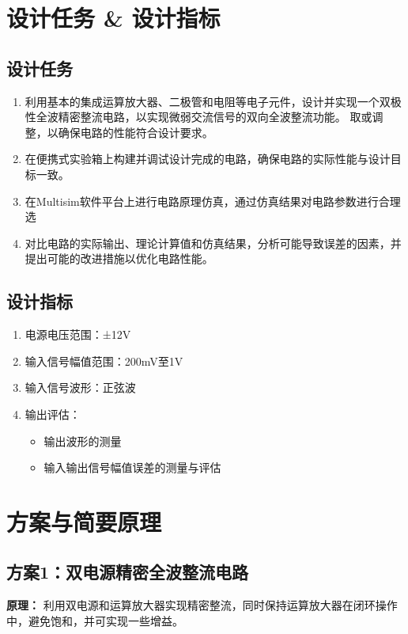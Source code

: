 \documentclass[UTF8,titlepage,a4paper]{ctexart}
\numberwithin{figure}{section}
\begin{document}
\section{设计任务 \& 设计指标}
\subsection{设计任务}
\begin{enumerate}
    \item 利用基本的集成运算放大器、二极管和电阻等电子元件，设计并实现一个双极性全波精密整流电路，以实现微弱交流信号的双向全波整流功能。
取或调整，以确保电路的性能符合设计要求。
    \item 在便携式实验箱上构建并调试设计完成的电路，确保电路的实际性能与设计目标一致。    \item 在Multisim软件平台上进行电路原理仿真，通过仿真结果对电路参数进行合理选
    \item 对比电路的实际输出、理论计算值和仿真结果，分析可能导致误差的因素，并提出可能的改进措施以优化电路性能。
\end{enumerate}

\subsection{设计指标}
\begin{enumerate}
    \item 电源电压范围：±12V
    \item 输入信号幅值范围：200mV至1V
    \item 输入信号波形：正弦波
    \item 输出评估：
       \begin{itemize}
           \item 输出波形的测量
           \item 输入输出信号幅值误差的测量与评估
       \end{itemize}
\end{enumerate}

\clearpage
\section{方案与简要原理}

\subsection{方案1：双电源精密全波整流电路}

\textbf{原理：} 利用双电源和运算放大器实现精密整流，同时保持运算放大器在闭环操作中，避免饱和，并可实现一些增益。
\end{document}
